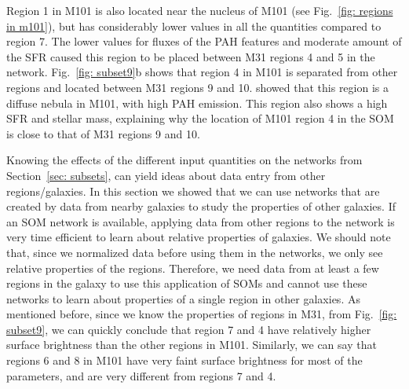     Region 1 in M101 is also located near the nucleus of M101 (see Fig.~\ref{fig: regions in m101}), but has considerably lower values in all the quantities compared to region 7.
    The lower values for fluxes of the PAH features and moderate amount of the SFR caused this region to be placed between M31 regions 4 and 5 in the network. 
    Fig.~\ref{fig: subset9}b shows that region 4 in M101 is separated from other regions and located between M31 regions 9 and 10.
    \cite{Gordon08} showed that this region is a diffuse nebula in M101, with high PAH emission. 
    This region also shows a high SFR and stellar mass, explaining why the location of M101 region 4 in the SOM is close to that of M31 regions 9 and 10.
    
    Knowing the effects of the different input quantities on the networks from Section~\ref{sec: subsets}, can yield ideas about data entry from other regions/galaxies.
    In this section we showed that we can use networks that are created by data from nearby galaxies to study the properties of other galaxies.
    If an SOM network is available, applying data from other regions to the network is very time efficient to learn about relative properties of galaxies.
    We should note that, since we normalized data before using them in the networks, we only see relative properties of the regions.
    Therefore, we need data from at least a few regions in the galaxy to use this application of SOMs and cannot use these networks to learn about properties of a single region in other galaxies.
    As mentioned before, since we know the properties of regions in M31, from Fig.~\ref{fig: subset9}, we can quickly conclude that region 7 and 4 have relatively higher surface brightness than the other regions in M101. 
    Similarly, we can say that regions 6 and 8 in M101 have very faint surface brightness for most of the parameters, and are very different from regions 7 and 4.
    
    
    